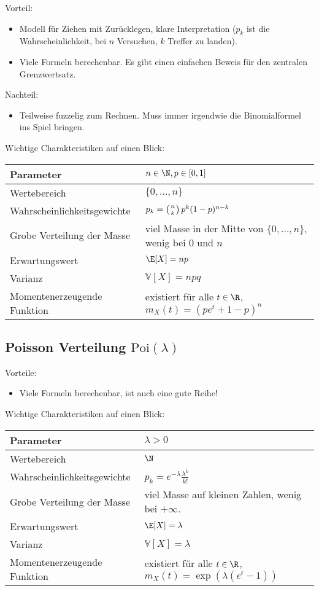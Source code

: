 {Vorteil:} 
\begin{itemize}
	\item Modell f\"ur Ziehen mit Zur\"ucklegen, klare Interpretation ($p_k$ ist die Wahrscheinlichkeit, bei $n$ Versuchen, $k$ Treffer zu landen).
	\item Viele Formeln berechenbar. Es gibt einen einfachen Beweis f\"ur den zentralen Grenzwertsatz.
\end{itemize}
Nachteil:
\begin{itemize}
 	\item Teilweise fuzzelig zum Rechnen. Muss immer irgendwie die Binomialformel ins Spiel bringen.
\end{itemize}
Wichtige Charakteristiken auf einen Blick:
\begin{center}
\begin{tabular}[h]{|l|l|}
\hline
Parameter& $n\in \N, p\in [0,1]$ \\
\hline
Wertebereich & $\{0,...,n\}$\\
\hline
Wahrscheinlichkeitsgewichte& $p_k=\left(n\atop k\right) p^k(1-p)^{n-k}$\\
\hline
Grobe Verteilung der Masse & viel Masse in der Mitte von $\{0,...,n\}$, wenig bei $0$ und $n$\\
\hline
Erwartungswert& $\E[X]=np $ \\
\hline
Varianz & $\mathbb V[X]=npq$\\
\hline
Momentenerzeugende Funktion& existiert f\"ur alle $t\in \R$, $m_X(t)=(pe^t+1-p)^n$\\
\hline
\end{tabular}
\end{center}


\subsection{Poisson Verteilung $\text{Poi}(\lambda)$}

{Vorteile:} 
\begin{itemize}
	\item Viele Formeln berechenbar, ist auch eine gute Reihe!
\end{itemize}


Wichtige Charakteristiken auf einen Blick:
\begin{center}
\begin{tabular}[h]{|l|l|}
\hline
Parameter& $\lambda>0$ \\
\hline
Wertebereich & $\N$\\
\hline
Wahrscheinlichkeitsgewichte& $p_k=e^{-\lambda} \frac{\lambda^k}{k!}$\\
\hline
Grobe Verteilung der Masse & viel Masse auf kleinen Zahlen, wenig bei $+\infty$.\\
\hline
Erwartungswert& $\E[X]=\lambda$ \\
\hline
Varianz & $\mathbb V[X]=\lambda$\\
\hline
Momentenerzeugende Funktion& existiert f\"ur alle $t\in \R$, $m_X(t)=\exp(\lambda(e^t-1))$\\
\hline
\end{tabular}
\end{center}



